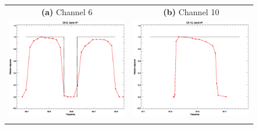 \begin{figure}[htp]
  \centering
  \begin{tabular}{c c}
    \textsf{\textbf{(a)} Channel 6} &
    \textsf{\textbf{(b)} Channel 10} \\
    \includegraphics[scale=0.5]{graphics/srf/atms_npp.ch6.srf.eps} &
    \includegraphics[scale=0.5]{graphics/srf/atms_npp.ch10.srf.eps} \\\\


\end{tabular}
\end{figure}
